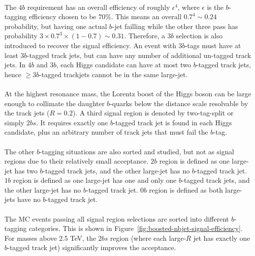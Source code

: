 \paragraph{}
The $4b$ requirement has an overall efficiency of roughly $\epsilon^4$, where $\epsilon$ is the $b$-tagging efficiency chosen to be $70\%$.
This means an overall $0.7^4 \sim 0.24$ probability, but having one actual $b$-jet failling while the other three pass has probability $3 \times 0.7^3 \times (1-0.7) \sim 0.31$.
Therefore, a $3b$ selection is also introduced to recover the signal efficiency. 
An event with $3b$-tags must have at least $3b$-tagged track jets, but can have any number of additional un-tagged track jets.
In $4b$ and $3b$, each Higgs candidate can have at most two $b$-tagged track jets, hence $\geq 3b$-tagged trackjets cannot be in the same large-\R jet.

\paragraph{}
At the highest resonance mass, the Lorentz boost of the Higgs boson can be large enough to collimate the daughter $b$-quarks below the distance scale resolvable by the track jets ($R=0.2$). A third signal region is denoted by two-tag-split or simply $2bs$.
It requires exactly one $b$-tagged track jet is found in each Higgs candidate, plus an arbitrary number of track jets that must fail the $b$-tag.

\paragraph{}
The other $b$-tagging situations are also sorted and studied, but not as signal regions due to their relatively small acceptance. $2b$ region is defined as one large-\R jet has two $b$-tagged track jets, and the other large-\R jet has no $b$-tagged track jet. $1b$ region is defined as one large-\R jet has one and only one $b$-tagged track jets, and the other large-\R jet has no $b$-tagged track jet. $0b$ region is defined as both large-\R jets have no $b$-tagged track jet.

\paragraph{}
The MC events passing all signal region selections are sorted into different $b$-tagging categories. This is shown in Figure~\ref{fig:boosted-nbjet-signal-efficiency}. 
For masses above 2.5 TeV, the $2bs$ region (where each large-$R$ jet has exactly one $b$-tagged track jet) significantly improves the acceptance.

